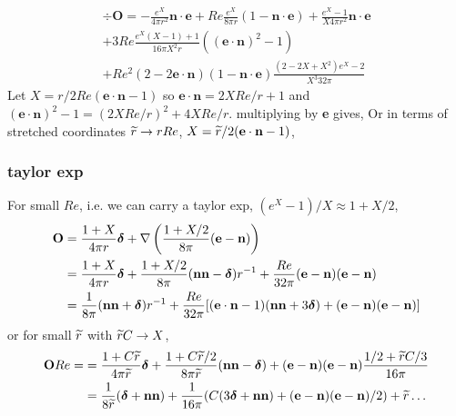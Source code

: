 \begin{multline}
    \div\textbf{O} =
    - \frac{e^X}{4\pi r^2}\textbf{n} \cdot \textbf{e}
    + Re\frac{e^X}{8\pi r}(1-\textbf{n}\cdot \textbf{e})
    + \frac{e^X-1}{X 4 \pi r^2} \textbf{n}\cdot \textbf{e}  \\
    +3 Re\frac{e^X(X-1)+1}{16 \pi X^2 r} ((\textbf{e}\cdot \textbf{n})^2 -1)\\
    + 
    Re^2 
    (2 -2 \textbf{e}\cdot \textbf{n})
    (1 - \textbf{n}\cdot \textbf{e})
    \frac{(2-2X +X^2) e^X - 2}{X^3 32 \pi}
\end{multline}
Let $X = r/2 Re (\textbf{e}\cdot \textbf{n}-1)$ so $\textbf{e}\cdot \textbf{n}= 2 X Re/r+1$ and $(\textbf{e}\cdot \textbf{n})^2-1= (2 X Re/r)^2+4 X Re/r$. 
multiplying by \textbf{e} gives, 
Or in terms of stretched coordinates $\widetilde{r}\to r Re$,  $X = \widetilde{r}/2 (\textbf{e}\cdot \textbf{n}- 1)$,

\subsubsection{taylor exp}
For small $Re$, i.e. we can carry a taylor exp, $(e^X - 1)/X \approx 1+ X/2$, 
\begin{align*}
    \textbf{O}
    &= 
    \frac{1+X}{4\pi r}\bm\delta
    +\mathbf{\nabla} \left(\frac{1+X/2}{8\pi} (\textbf{e}-\textbf{n})\right)\\
    &= 
    \frac{1+X}{4\pi r}\bm\delta
    +\frac{1+X/2}{8\pi} (\textbf{nn}-\bm\delta) r^{-1}
    +\frac{Re}{32\pi} (\textbf{e}-\textbf{n})(\textbf{e}-\textbf{n})\\
    &= 
    \frac{1}{8\pi} (\textbf{nn}+\bm\delta) r^{-1}
    +\frac{Re}{32\pi} [(\textbf{e}\cdot \textbf{n} - 1) (\textbf{nn}+3\bm\delta)
    +(\textbf{e}-\textbf{n})(\textbf{e}-\textbf{n})]
\end{align*}
or for small $\widetilde{r}$ with $\widetilde{r} C\to X$, 
\begin{align}
    \textbf{O}Re = 
    &= 
    \frac{1+C \widetilde{r}}{4\pi \widetilde{r}}\bm\delta
    + \frac{1 + C\widetilde{r}/2}{8 \pi \widetilde{r}}  (\textbf{nn} -\bm\delta)
    + 
    (\textbf{e} - \textbf{n})
    (\textbf{e} - \textbf{n})
    \frac{1/2+\widetilde{r} C/3}{16 \pi}\\
    &= 
    \frac{1}{8\widetilde{r}}(\bm\delta+\textbf{nn})
    + \frac{1}{16\pi} (C(3\bm\delta + \textbf{nn})
    + (\textbf{e} - \textbf{n})
    (\textbf{e} - \textbf{n})/2
    )
    + \widetilde{r}\ldots
\end{align}



